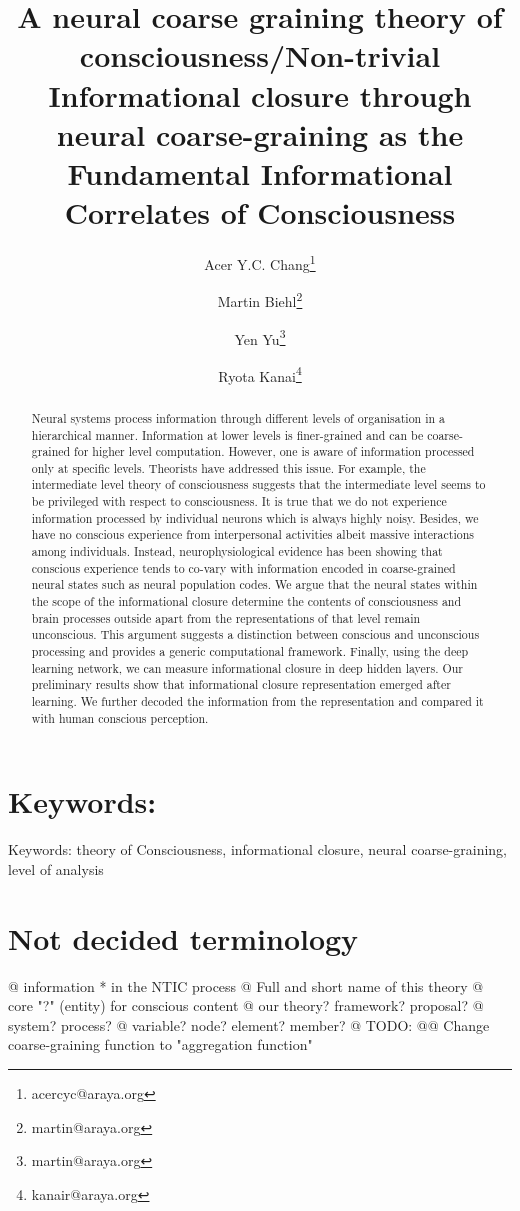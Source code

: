 \documentclass[utf8]{article}
\title{A neural coarse graining theory of consciousness/\newline Non-trivial Informational closure through neural coarse-graining as the Fundamental Informational Correlates of Consciousness }
\author[1]{Acer Y.C. Chang\thanks{acercyc@araya.org}}
\author[1]{Martin Biehl\thanks{martin@araya.org}}
\author[1]{Yen Yu\thanks{martin@araya.org}}
\author[1]{Ryota Kanai\thanks{kanair@araya.org }}
\affil[1]{ARAYA, Inc., Tokyo, Japan}
\begin{document}
	\maketitle
	\tableofcontents


	\begin{abstract}
		Neural systems process information through different levels of organisation in a hierarchical manner. Information at lower levels is finer-grained and can be coarse-grained for higher level computation. However, one is aware of information processed only at specific levels. Theorists have addressed this issue. For example, the intermediate level theory of consciousness suggests that the intermediate level seems to be privileged with respect to consciousness. It is true that we do not experience information processed by individual neurons which is always highly noisy. Besides, we have no conscious experience from interpersonal activities albeit massive interactions among individuals. Instead, neurophysiological evidence has been showing that conscious experience tends to co-vary with information encoded in coarse-grained neural states such as neural population codes. We argue that the neural states within the scope of the informational closure determine the contents of consciousness and brain processes outside apart from the representations of that level remain unconscious. This argument suggests a distinction between conscious and unconscious processing and provides a generic computational framework. Finally, using the deep learning network, we can measure informational closure in deep hidden layers. Our preliminary results show that informational closure representation emerged after learning. We further decoded the information from the representation and compared it with human conscious perception.
	\end{abstract}


	\section*{Keywords:}
	Keywords: theory of Consciousness, informational closure, neural coarse-graining, level of analysis

    \newpage
    \section*{Not decided terminology}
        \begin{ants}
            @ information * in the NTIC process
            @ Full and short name of this theory
            @ core "?" (entity) for conscious content 
            @ our theory? framework? proposal? 
            @ system? process?
            @ variable? node? element? member?
            @ TODO:
                @@ Change coarse-graining function to "aggregation function"
        \end{ants}
    
\end{document}
